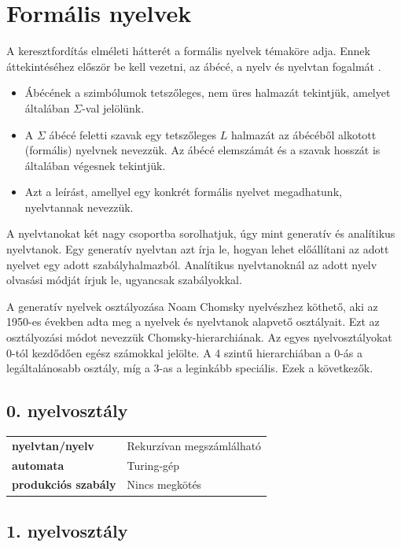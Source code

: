 
\section{Formális nyelvek}

A keresztfordítás elméleti hátterét a formális nyelvek témaköre adja.
Ennek áttekintéséhez először be kell vezetni, az ábécé, a nyelv és nyelvtan fogalmát \cite{formalis}.
\begin{itemize}
\item Ábécének a szimbólumok tetszőleges, nem üres halmazát tekintjük, amelyet általában $\Sigma$-val jelölünk.
\item A $\Sigma$ ábécé feletti szavak egy tetszőleges $L$ halmazát az ábécéből alkotott (formális) nyelvnek nevezzük.
Az ábécé elemszámát és a szavak hosszát is általában végesnek tekintjük.
\item Azt a leírást, amellyel egy konkrét formális nyelvet megadhatunk, nyelvtannak nevezzük.
\end{itemize}
\cite{formalis}

A nyelvtanokat két nagy csoportba sorolhatjuk, úgy mint generatív és analítikus nyelvtanok.
Egy generatív nyelvtan azt írja le, hogyan lehet előállítani az adott nyelvet egy adott szabályhalmazból.
Analítikus nyelvtanoknál az adott nyelv olvasási módját írjuk le, ugyancsak szabályokkal.

A generatív nyelvek osztályozása Noam Chomsky nyelvészhez köthető, aki az 1950-es években adta meg a nyelvek és nyelvtanok alapvető osztályait. Ezt az osztályozási módot nevezzük Chomsky-hierarchiának. Az egyes nyelvosztályokat 0-tól kezdődően egész számokkal jelölte. A 4 szintű hierarchiában a 0-ás a legáltalánosabb osztály, míg a 3-as a leginkább speciális. Ezek a következők.

\subsection*{0. nyelvosztály}

\begin{tabular}{ll}
\textbf{nyelvtan/nyelv} & Rekurzívan megszámlálható \\
\textbf{automata} & Turing-gép \\
\textbf{produkciós szabály} & Nincs megkötés \\
\end{tabular}

\subsection*{1. nyelvosztály}

